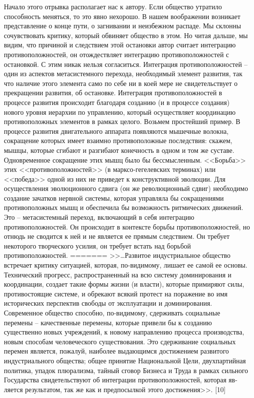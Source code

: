 \documentclass{book}
\begin{document}
{Начало этого отрывка располагает нас к автору. Если обще­ство утратило способность меняться, то это явно нехорошо. В нашем воображении возникает представление о конце пути, о загнивании и неизбежном распаде. Мы склонны сочувство­вать критику, который обвиняет общество в этом. Но читая дальше, мы видим, что причиной и следствием этой остановки автор считает интеграцию противоположностей, он отождест­вляет интеграцию противоположностей с остановкой. С этим никак нельзя согласиться. Интеграция противоположностей -- один из аспектов метасистемного перехода, необходимый эле­мент развития, так что наличие этого элемента само по себе ни в коей мере не свидетельствует о прекращении развития, об остановке. Интеграция противоположностей в процессе раз­вития происходит благодаря созданию (и в процессе создания) нового уровня иерархии по управлению, который осуществля­ет координацию противоположных элементов в рамках целого. Возьмем простейший пример. В процессе развития двигатель­ного аппарата появляются мышечные волокна, сокращение ко­торых имеет взаимно противоположные последствия: скажем, мышцы, которые сгибают и разгибают конечность в одном и том же суставе. Одновременное сокращение этих мышц было бы бессмысленным. <<Борьба>> этих <<противоположностей>> (в марксо‑гегелевских терминах) или <<победа>> одной из них не приведет к конструктивной эволюции. Для осуществления эволюционного сдвига (он же революционный сдвиг) необхо­димо создание зачатков нервной системы, которая управляла бы сокращениями противоположных мышц и обеспечила бы возможность ритмических движений. Это -- метасистемный переход, включающий в себя интеграцию противоположностей. Он происходит в контексте  борьбы противоположностей, но отнюдь не сводится  к ней и не является ее прямым следствием. Он требует некоторого творческого усилия, он требует встать над  борьбой противоположностей.
=======
>>\ldots Развитое индустриальное общество встречает критику ситуацией, которая, по-видимому, лишает ее самой ее основы. Технический прогресс, распространенный на всю систему доминирования и координации, создает такие формы жизни (и власти), которые примиряют силы, противостоящие системе, и обрекают всякий протест на поражение во имя исторических перспектив свободы от эксплуатации и доминирования. Современное общество способно, по-видимому, сдерживать социальные перемены -- качественные перемены, которые привели бы к созданию существенно новых учреждений, к новому направлению процесса производства, новым способам человеческого существования. Это сдерживание социальных перемен являет­ся, пожалуй, наиболее выдающимся достижением развитого индустриального общества; общее принятие Национальной Цели, двухпартийная политика, упадок плюрализма, тайный сговор Бизнеса и Труда в рамках сильного Государства сви­детельствуют об интеграции противоположностей, которая яв­ляется результатом, так же как и предпосылкой этого 
дости­жения>>. [10]

}
\end{document}
